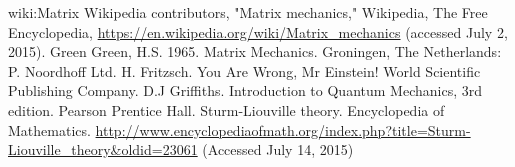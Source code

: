 \documentclass{article}
\numberwithin{equation}{subsection} %
\begin{document}
\begin{thebibliography}{1}
	\bibitem
	{wiki:Matrix} Wikipedia contributors, "Matrix mechanics," 
	Wikipedia, The Free Encyclopedia, 
	\url{https://en.wikipedia.org/wiki/Matrix_mechanics}
	(accessed July 2, 2015).
	\bibitem
	{Green} Green, H.S. 1965. Matrix Mechanics. Groningen, 
	The Netherlands: P. Noordhoff Ltd.
	H. Fritzsch. You Are Wrong, Mr Einstein! World Scientific Publishing Company.
	D.J Griffiths. Introduction to Quantum Mechanics, 3rd edition.
	Pearson Prentice Hall.
	Sturm-Liouville theory. Encyclopedia of Mathematics. 
	\url{http://www.encyclopediaofmath.org/index.php?title=Sturm-Liouville_theory&oldid=23061}
	(Accessed July 14, 2015)
\end{thebibliography}
\end{document}
